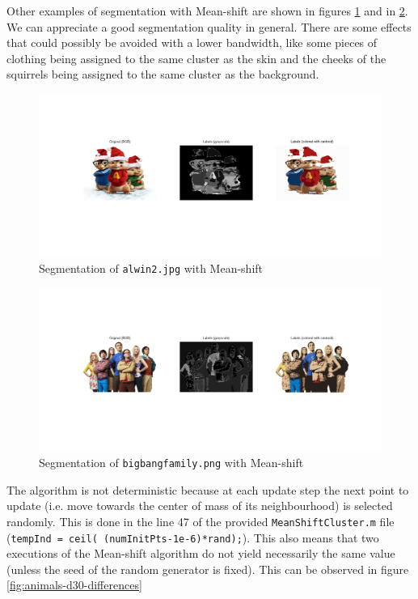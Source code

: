 Other examples of segmentation with Mean-shift are shown in figures
\ref{fig:alwin2-d30-no-spatial} and in \ref{fig:bigbangfamily-d30-no-spatial}.
We can appreciate a good segmentation quality in general. There are some
effects that could possibly be avoided with a lower bandwidth, like some
pieces of clothing being assigned to the same cluster as the skin and
the cheeks of the squirrels being assigned to the same cluster as the background.

\begin{figure}[hbt]
\centering
\includegraphics[trim={50px 100px 50px 100px},clip,width=\textwidth]{img/mshift/alwin2_d30_no_spatial.png}
\caption{Segmentation of \texttt{alwin2.jpg} with Mean-shift}
\label{fig:alwin2-d30-no-spatial}
\end{figure}

\begin{figure}[hbt]
\centering
\includegraphics[trim={50px 100px 50px 100px},clip,width=\textwidth]{img/mshift/bigbang_d30_no_spatial.png}
\caption{Segmentation of \texttt{bigbangfamily.png} with Mean-shift}
\label{fig:bigbangfamily-d30-no-spatial}
\end{figure}

The algorithm is not deterministic because at each update step the next
point to update (i.e. move towards the center of mass of its neighbourhood)
is selected randomly. This is done in the 
line 47 of the provided \texttt{MeanShiftCluster.m} file
(\texttt{tempInd = ceil( (numInitPts-1e-6)*rand);}).
This also means that two executions of the Mean-shift algorithm do
not yield necessarily the same value
(unless the seed of the random generator is fixed). This can be
observed in figure \ref{fig:animals-d30-differences}

